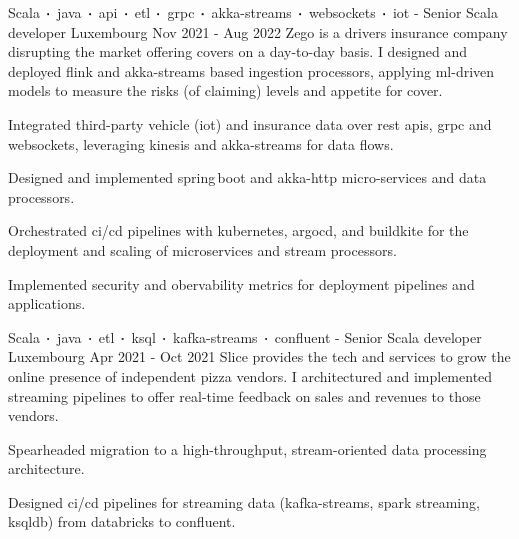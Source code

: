 \begin{cventries}

    \cventry
    {Scala$\sqbig$java$\sqbig$api$\sqbig$etl$\sqbig$grpc$\sqbig$akka-streams$\sqbig$websockets$\sqbig$iot}
    { - Senior Scala developer}
    {Luxembourg}
    {Nov 2021 - Aug 2022}
    {Zego is a drivers insurance company disrupting the market offering covers on a day-to-day basis. I designed and deployed flink and akka-streams based ingestion processors, applying ml-driven models to measure the risks (of claiming) levels and appetite for cover.}
    {
        \begin{cvitems}
            \item{Integrated third-party vehicle (iot) and insurance data over rest apis, grpc and websockets, leveraging kinesis and akka-streams for data flows.}
            \item{Designed and implemented spring\,boot and akka-http micro-services and data processors.}
            \item{Orchestrated ci/cd pipelines with kubernetes, argocd, and buildkite for the deployment and scaling of microservices and stream processors.}
            \item{Implemented security and obervability metrics for deployment pipelines and applications.}
        \end{cvitems}
    }


    \cventry
    {Scala$\sqbig$java$\sqbig$etl$\sqbig$ksql$\sqbig$kafka-streams$\sqbig$confluent}
    { - Senior Scala developer}
    {Luxembourg}
    {Apr 2021 - Oct 2021}
    {Slice provides the tech and services to grow the online presence of independent pizza vendors. I architectured and implemented streaming pipelines to offer real-time feedback on sales and revenues to those vendors.}
    {
        \begin{cvitems}
            \item{Spearheaded migration to a high-throughput, stream-oriented data processing architecture.}
            \item{Designed ci/cd pipelines for streaming data (kafka-streams, spark streaming, ksqldb) from databricks to confluent.}
        \end{cvitems}
    }


\end{cventries}
